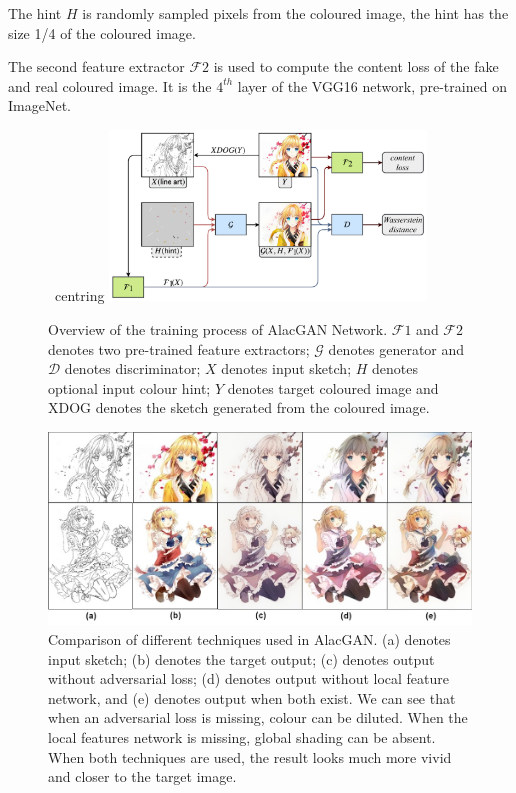 The hint $H$ is randomly sampled pixels from the coloured image, the hint has the size 1/4 of the coloured image.

The second feature extractor $\mathcal{F}2$ is used to compute the content loss of the fake and real coloured image. It is the $4^{th}$ layer of the VGG16 network, pre-trained on ImageNet\cite{ImageNet}.

\begin{figure}
    \ centring
    \includegraphics[width=0.75\textwidth]{images/colorization/alacgan_train.png}
    \caption[Overview of the training process of AlacGAN Network.]{Overview of the training process of AlacGAN Network. $\mathcal{F}1$ and $\mathcal{F}2$ denotes two pre-trained feature extractors; $\mathcal{G}$ denotes generator and $\mathcal{D}$ denotes discriminator; $X$ denotes input sketch; $H$ denotes optional input colour hint; $Y$ denotes target coloured image and XDOG denotes the sketch generated from the coloured image.} 
    \label{fig:alacgan_train}
\end{figure}

\begin{figure}
    \centering
    \includegraphics[width=1.0\textwidth]{images/colorization/alacgan_features.jpg}
    \caption[Comparison of different techniques used in AlacGAN.]{Comparison of different techniques used in AlacGAN. (a) denotes input sketch; (b) denotes the target output; (c) denotes output without adversarial loss; (d) denotes output without local feature network, and (e) denotes output when both exist. We can see that when an adversarial loss is missing, colour can be diluted. When the local features network is missing, global shading can be absent. When both techniques are used, the result looks much more vivid and closer to the target image.} 
    \label{fig:alacgan_features}
\end{figure}

